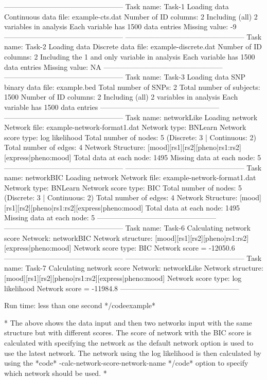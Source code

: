 -------------------------------------------------- Task name: Task-1 Loading data Continuous data file: example-cts.dat Number of ID columns: 2 Including (all) 2 variables in analysis Each variable has 1500 data entries Missing value: -9 -------------------------------------------------- -------------------------------------------------- Task name: Task-2 Loading data Discrete data file: example-discrete.dat Number of ID columns: 2 Including the 1 and only variable in analysis Each variable has 1500 data entries Missing value: NA -------------------------------------------------- -------------------------------------------------- Task name: Task-3 Loading data SNP binary data file: example.bed Total number of SNPs: 2 Total number of subjects: 1500 Number of ID columns: 2 Including (all) 2 variables in analysis Each variable has 1500 data entries -------------------------------------------------- -------------------------------------------------- Task name: networkLike Loading network Network file: example-network-format1.dat Network type: BNLearn Network score type: log likelihood Total number of nodes: 5 (Discrete: 3 | Continuous: 2) Total number of edges: 4 Network Structure: [mood][rs1][rs2][pheno|rs1:rs2][express|pheno:mood] Total data at each node: 1495 Missing data at each node: 5 -------------------------------------------------- -------------------------------------------------- Task name: networkBIC Loading network Network file: example-network-format1.dat Network type: BNLearn Network score type: BIC Total number of nodes: 5 (Discrete: 3 | Continuous: 2) Total number of edges: 4 Network Structure: [mood][rs1][rs2][pheno|rs1:rs2][express|pheno:mood] Total data at each node: 1495 Missing data at each node: 5 -------------------------------------------------- -------------------------------------------------- Task name: Task-6 Calculating network score Network: networkBIC Network structure: [mood][rs1][rs2][pheno|rs1:rs2][express|pheno:mood] Network score type: BIC Network score = -12050.6 -------------------------------------------------- -------------------------------------------------- Task name: Task-7 Calculating network score Network: networkLike Network structure: [mood][rs1][rs2][pheno|rs1:rs2][express|pheno:mood] Network score type: log likelihood Network score = -11984.8 --------------------------------------------------

Run time: less than one second */codeexample*

* The above shows the data input and then two networks input with the same structure but with different scores. The score of network with the BIC score is calculated with specifying the network as the default network option is used to use the latest network. The network using the log likelihood is then calculated by using the *code* -calc-network-score-network-name */code* option to specify which network should be used. *


